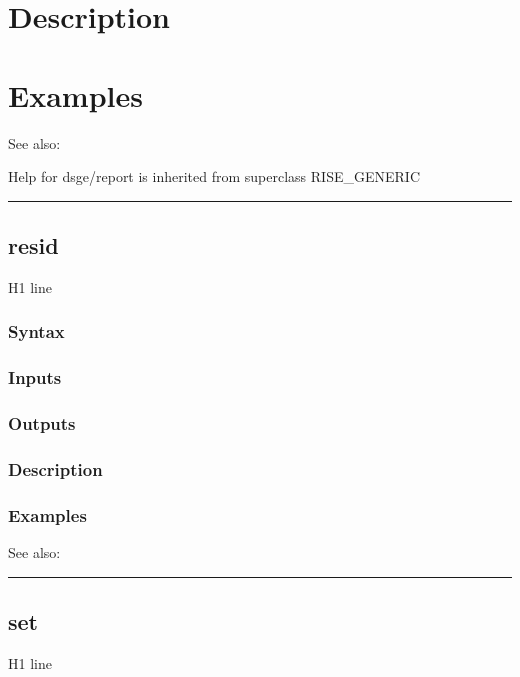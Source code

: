 \documentclass[letterpaper,10pt,english]{sphinxmanual}
\begin{document}
\section{Description}
\label{classes/models/@dsge/dsge:id141}

\section{Examples}
\label{classes/models/@dsge/dsge:id142}
See also:

Help for dsge/report is inherited from superclass RISE\_GENERIC


\bigskip\hrule{}\bigskip



\subsection{resid}
\label{classes/models/@dsge/dsge:resid}\label{classes/models/@dsge/dsge:id143}
H1 line


\subsubsection{Syntax}
\label{classes/models/@dsge/dsge:id144}

\subsubsection{Inputs}
\label{classes/models/@dsge/dsge:id145}

\subsubsection{Outputs}
\label{classes/models/@dsge/dsge:id146}

\subsubsection{Description}
\label{classes/models/@dsge/dsge:id147}

\subsubsection{Examples}
\label{classes/models/@dsge/dsge:id148}
See also:


\bigskip\hrule{}\bigskip



\subsection{set}
\label{classes/models/@dsge/dsge:set}\label{classes/models/@dsge/dsge:id149}
H1 line
\end{document}
